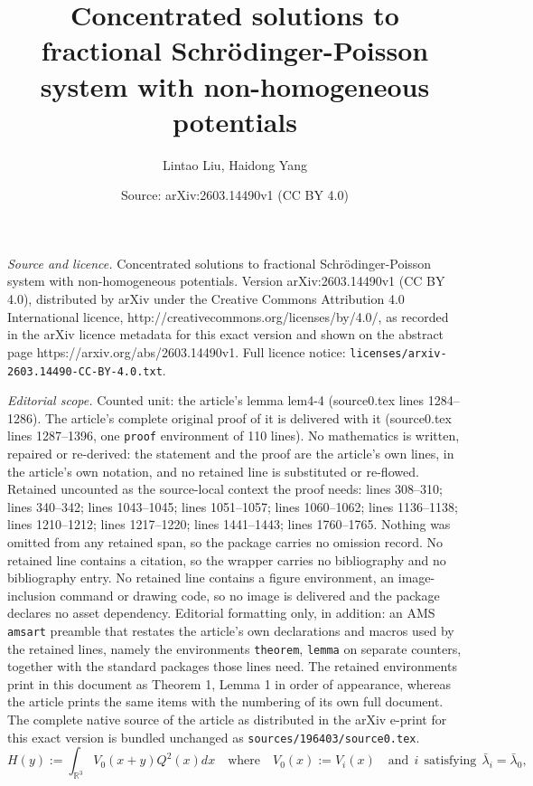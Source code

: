 \documentclass[10pt,a4paper]{amsart}
\title{Concentrated solutions to fractional Schr\"{o}dinger-Poisson system with non-homogeneous potentials}
\author{Lintao Liu, Haidong Yang}
\date{Source: arXiv:2603.14490v1 (CC BY 4.0)}
\begin{document}
\maketitle

\noindent\emph{Source and licence.} Concentrated solutions to fractional Schr\"{o}dinger-Poisson system with non-homogeneous potentials. Version arXiv:2603.14490v1 (CC BY 4.0), distributed by arXiv under the Creative Commons Attribution 4.0 International licence, http://creativecommons.org/licenses/by/4.0/, as recorded in the arXiv licence metadata for this exact version and shown on the abstract page https://arxiv.org/abs/2603.14490v1. Full licence notice: \texttt{licenses/arxiv-2603.14490-CC-BY-4.0.txt}.\par\smallskip

\noindent\textit{Editorial scope.} Counted unit: the article's lemma lem4-4 (source0.tex lines 1284--1286). The article's complete original proof of it is delivered with it (source0.tex lines 1287--1396, one \texttt{proof} environment of 110 lines). No mathematics is written, repaired or re-derived: the statement and the proof are the article's own lines, in the article's own notation, and no retained line is substituted or re-flowed.  Retained uncounted as the source-local context the proof needs: lines 308--310; lines 340--342; lines 1043--1045; lines 1051--1057; lines 1060--1062; lines 1136--1138; lines 1210--1212; lines 1217--1220; lines 1441--1443; lines 1760--1765.  Nothing was omitted from any retained span, so the package carries no omission record.  No retained line contains a citation, so the wrapper carries no bibliography and no bibliography entry.  No retained line contains a figure environment, an image-inclusion command or drawing code, so no image is delivered and the package declares no asset dependency.  Editorial formatting only, in addition: an AMS \texttt{amsart} preamble that restates the article's own declarations and macros used by the retained lines, namely the environments \texttt{theorem}, \texttt{lemma} on separate counters, together with the standard packages those lines need.  The retained environments print in this document as Theorem 1, Lemma 1 in order of appearance, whereas the article prints the same items with the numbering of its own full document.  The complete native source of the article as distributed in the arXiv e-print for this exact version is bundled unchanged as \texttt{sources/196403/source0.tex}.
	\begin{equation}\label{equ13}
		H(y):=	\int_{\mathbb{R}^{3}}V_{0}(x+y)Q^{2}(x)dx\quad \mathrm {where} \quad V_{0}(x):=V_{i}(x) \quad \mathrm {and }~~i~~\mathrm {satisfying }~~ \bar{\lambda}_{i}=\bar{\lambda}_{0},
	\end{equation}
\end{document}

